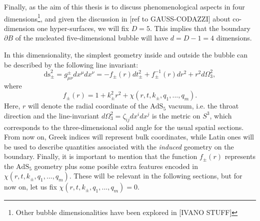 \documentclass[12pt, a4paper]{article} %
\begin{document}
Finally, as the aim of this thesis is to discuss phenomenological aspects in four dimensions\footnote{Other bubble dimensionalities have been explored in [IVANO STUFF]}, and given the discussion in [ref to GAUSS-CODAZZI] about co-dimension one hyper-surfaces, we will fix $D=5$. This implies that the boundary $\partial B$ of the nucleated five-dimensional bubble will have $d = D-1 = 4$ dimensions.

In this dimensionality, the simplest geometry inside and outside the bubble can be described by the following line invariant:
\begin{equation}\label{eq: basic_global_bubble}
	\text{ds}_{\pm}^{2} = g^{\pm}_{\mu\nu} dx^{\mu} dx^{\nu} =  -f_{\pm}(r) dt_{\pm}^{2} + f^{-1}_{\pm}(r) dr^{2} + r^{2} d\Omega_{3}^{2},
\end{equation}
where
\begin{equation}\label{eq: vacuum_func}
	f_{\pm}(r) = 1 + k_{\pm}^{2} r^{2} + \chi(r, t, k_{\pm}, q_{1},..., q_{m}).
\end{equation}
Here, $r$ will denote the radial coordinate of the $\text{AdS}_{5}$ vacuum, i.e. the throat direction and the line-invariant $d\Omega_{3}^{2} = \zeta_{ij}dx^{i}dx^{j}$ is the metric on $S^{3}$, which corresponds to the three-dimensional solid angle for the usual spatial sections. From now on, Greek indices will represent bulk coordinates, while Latin ones will be used to describe quantities associated with the \textit{induced} geometry on the boundary. Finally, it is important to mention that the function $f_{\pm}(r)$ represents the $\text{AdS}_{5}$ geometry plus some posible extra features encoded in $\chi(r, t, k_{\pm}, q_{1},..., q_{m})$. These will be relevant in the following sections, but for now on, let us fix $\chi(r, t, k_{\pm}, q_{1},..., q_{m}) =0$.
\end{document}
